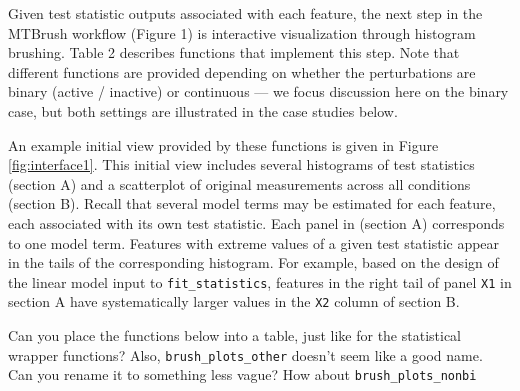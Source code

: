 Given test statistic outputs associated with each feature, the next step
in the MTBrush workflow (Figure 1) is interactive visualization through
histogram brushing. Table 2 describes functions that implement this
step. Note that different functions are provided depending on whether
the perturbations are binary (active / inactive) or continuous --- we
focus discussion here on the binary case, but both settings are
illustrated in the case studies below.

An example initial view provided by these functions is given in Figure
\ref{fig:interface1}. This initial view includes several histograms of
test statistics (section A) and a scatterplot of original measurements
across all conditions (section B). Recall that several model terms may
be estimated for each feature, each associated with its own test
statistic. Each panel in (section A) corresponds to one model term.
Features with extreme values of a given test statistic appear in the
tails of the corresponding histogram. For example, based on the design
of the linear model input to \texttt{fit\_statistics}, features in the
right tail of panel \texttt{X1} in section A have systematically larger
values in the \texttt{X2} column of section B.

\color{violet} Can you place the functions below into a table, just like
for the statistical wrapper functions? Also,
\texttt{brush\_plots\_other} doesn't seem like a good name. Can you
rename it to something less vague? How about
\texttt{brush\_plots\_nonbi} \color{black}

